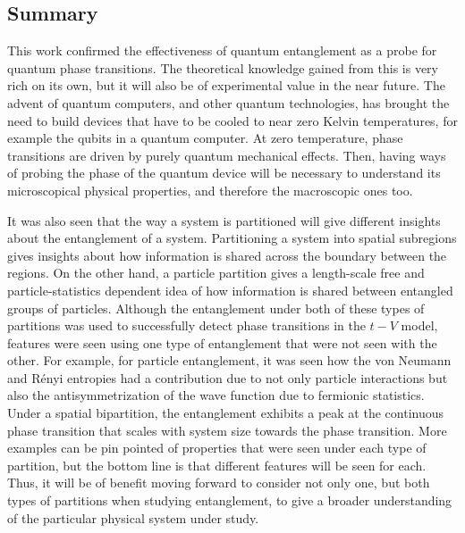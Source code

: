\subsection{Summary}

This work confirmed the effectiveness of quantum entanglement as a probe for quantum phase transitions. The theoretical knowledge gained from this is very rich on its own, but it will also be of experimental value in the near future. The advent of quantum computers, and other quantum technologies, has brought the need to build devices that have to be cooled to near zero Kelvin temperatures, for example the qubits in a quantum computer. At zero temperature, phase transitions are driven by purely quantum mechanical effects. Then, having ways of probing the phase of the quantum device will be necessary to understand its microscopical physical properties, and therefore the macroscopic ones too.

It was also seen that the way a system is partitioned will give different insights about the entanglement of a system. Partitioning a system into spatial subregions gives insights about how information is shared across the boundary between the regions. On the other hand, a particle partition gives a length-scale free and particle-statistics dependent idea of how information is shared between entangled groups of particles. Although the entanglement under both of these types of partitions was used to successfully detect phase transitions in the $t-V$ model, features were seen using one type of entanglement that were not seen with the other. For example, for particle entanglement, it was seen how the von Neumann and R\'enyi entropies had a contribution due to not only particle interactions but also the antisymmetrization of the wave function due to fermionic statistics. Under a spatial bipartition, the entanglement exhibits a peak at the continuous phase transition that scales with system size towards the phase transition. More examples can be pin pointed of properties that were seen under each type of partition, but the bottom line is that different features will be seen for each. Thus, it will be of benefit moving forward to consider not only one, but both types of partitions when studying entanglement, to give a broader understanding of the particular physical system under study.

